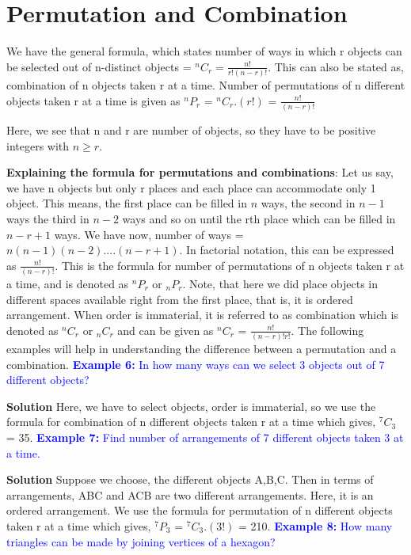 \documentclass[12pt, a4paper]{article}
\begin{document}
\section {Permutation and Combination}
\begin{tcolorbox}[colback=ProcessBlue!10!White,colframe=Blue!60!White]
We have the general formula, which states number of ways in which r objects can be selected out of n-distinct objects = $^{n}C_{r} = \frac{n!}{r!(n-r)!}$. This can also be stated as, combination of n objects taken r at a time. \newline
Number of permutations of n different objects taken r at a time is given as $^nP_r$ = $^{n}C_{r}.(r!)$ = $\frac{n!}{(n-r)!}$
\end{tcolorbox} 
Here, we see that n and r are number of objects, so they have to be positive integers with $n \geq r$. \newline \vspace{1mm}

\textbf{Explaining the formula for permutations and combinations}:
Let us say, we have n objects but only r places and each place can accommodate only 1 object. This means, the first place can be filled in $n$ ways, the second in $n-1$ ways the third in $n-2$ ways and so on until the rth place which can be filled in $n-r+1$ ways. We have now, number of ways = $n(n-1)(n-2)....(n-r+1)$. In factorial notation, this can be expressed as $\frac{n!}{(n-r)!}$. This is the formula for number of permutations of n objects taken r at a time, and is denoted as $^nP_r$ or $_nP_r$. Note, that here we did place objects in different spaces available right from the first place, that is, it is ordered arrangement. When order is immaterial, it is referred to as combination which is denoted as $^nC_r$ or $_nC_r$ and can be given as $^nC_r$ = $\frac{n!}{(n-r)! r!}$. \newline The following examples will help in understanding the difference between a permutation and a combination.\newline
\textcolor{blue}{\textbf{Example 6:} In how many ways can we select 3 objects out of 7 different objects?}

\textbf{Solution} Here, we have to select objects, order is immaterial, so we use the formula for combination of n different objects taken r at a time which gives, $^7C_3$ = 35.\newline
\textcolor{blue}{\textbf{Example 7:} Find number of arrangements of 7 different objects taken 3 at a time.}

\textbf{Solution} Suppose we choose, the different objects A,B,C. Then in terms of arrangements, ABC and ACB are two different arrangements. Here, it is an ordered arrangement. We use the formula for permutation of n different objects taken r at a time which gives, $^7P_3$ = $^7C_3.(3!)$ = 210.\newline
\textcolor{blue}{\textbf{Example 8:} How many triangles can be made by joining vertices of a hexagon?}
\end{document}

